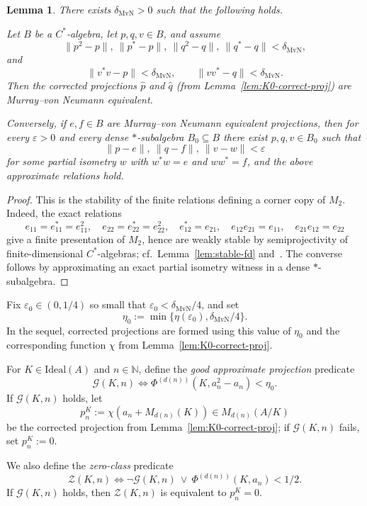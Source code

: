 \documentclass[12pt,fleqn,a4paper]{amsart}
\numberwithin{equation}{section}
\newtheorem{lemma}[theorem]{Lemma}
\theoremstyle{definition}
\newcommand{\N}{\mathbb{N}}
\newcommand{\Ideal}{\mathrm{Ideal}}
\begin{document}
\begin{lemma}
\label{lem:K0-stable-MvN}
There exists $\delta_{\mathrm{MvN}}>0$ such that the following holds.

Let $B$ be a $C^*$-algebra, let $p,q,v\in B$, and assume
\[
\|p^2-p\|,\ \|p^*-p\|,\ \|q^2-q\|,\ \|q^*-q\|<\delta_{\mathrm{MvN}},
\]
and
\[
\|v^*v-p\|<\delta_{\mathrm{MvN}},
\qquad
\|vv^*-q\|<\delta_{\mathrm{MvN}}.
\]
Then the corrected projections $\widehat p$ and $\widehat q$
(from Lemma~\ref{lem:K0-correct-proj}) are Murray--von Neumann equivalent.

Conversely, if $e,f\in B$ are Murray--von Neumann equivalent projections, then for every
$\varepsilon>0$ and every dense $*$-subalgebra $B_0\subseteq B$ there exist
$p,q,v\in B_0$ such that
\[
\|p-e\|,\ \|q-f\|,\ \|v-w\|<\varepsilon
\]
for some partial isometry $w$ with $w^*w=e$ and $ww^*=f$, and the above
approximate relations hold.
\end{lemma}

\begin{proof}
This is the stability of the finite relations defining a corner copy of $M_2$.
Indeed, the exact relations
\[
e_{11}=e_{11}^*=e_{11}^2,\quad
e_{22}=e_{22}^*=e_{22}^2,\quad
e_{12}^*=e_{21},\quad
e_{12}e_{21}=e_{11},\quad
e_{21}e_{12}=e_{22}
\]
give a finite presentation of $M_2$, hence are weakly stable by semiprojectivity of
finite-dimensional $C^*$-algebras; cf.\ Lemma~\ref{lem:stable-fd} and~\cite{Loring}.
The converse follows by approximating an exact partial isometry witness in a dense
$*$-subalgebra.
\end{proof}
Fix $\varepsilon_0\in(0,1/4)$ so small that
$\varepsilon_0<\delta_{\mathrm{MvN}}/4$, and set
\[
\eta_0:=\min\{\eta(\varepsilon_0),\delta_{\mathrm{MvN}}/4\}.
\]
In the sequel, corrected projections are formed using this value of $\eta_0$ and the
corresponding function $\chi$ from Lemma~\ref{lem:K0-correct-proj}.

For $K\in\Ideal(A)$ and $n\in\N$, define the \emph{good approximate projection}
predicate
\[
\mathcal G(K,n)\iff \Phi^{(d(n))}(K,a_n^2-a_n)<\eta_0.
\]
If $\mathcal G(K,n)$ holds, let
\[
p_n^K:=\chi(a_n+M_{d(n)}(K))\in M_{d(n)}(A/K)
\]
be the corrected projection from Lemma~\ref{lem:K0-correct-proj}; if
$\mathcal G(K,n)$ fails, set $p_n^K:=0$.

We also define the \emph{zero-class} predicate
\[
\mathcal Z(K,n)\iff
\neg\mathcal G(K,n)\ \lor\ \Phi^{(d(n))}(K,a_n)<1/2.
\]
If $\mathcal G(K,n)$ holds, then $\mathcal Z(K,n)$ is equivalent to $p_n^K=0$.
\end{document}
